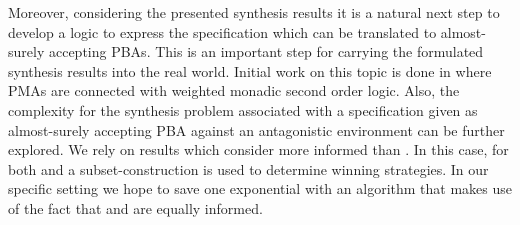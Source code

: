 Moreover, considering the presented synthesis results it is a natural next step
to develop a logic to express the specification which can be translated to
almost-surely accepting \acp{PBA}. This is an important step for carrying the
formulated synthesis results into the real world. Initial work on this topic
is done in \cite{ProbAutoProbLog} where \acp{PMA} are connected with weighted
monadic second order logic. Also, the complexity for the synthesis problem
associated with a specification given as almost-surely accepting \ac{PBA}
against an antagonistic environment can be further explored. We rely on results
which consider \adam{} more informed than \eve{}. In this case, for both
\adam{} and \eve{} a subset-construction is used to determine winning
strategies. In our specific setting we hope to save one exponential with an
algorithm that makes use of the fact that \eve{} and \adam{} are equally
informed.
